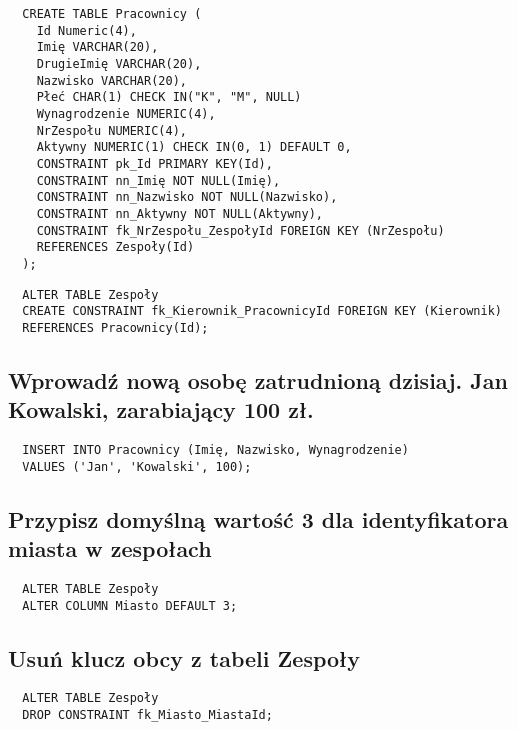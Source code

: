 \documentclass[a4paper]{article}
\begin{document}
\begin{verbatim}
  CREATE TABLE Pracownicy (
    Id Numeric(4),
    Imię VARCHAR(20),
    DrugieImię VARCHAR(20),
    Nazwisko VARCHAR(20),
    Płeć CHAR(1) CHECK IN("K", "M", NULL)
    Wynagrodzenie NUMERIC(4),
    NrZespołu NUMERIC(4),
    Aktywny NUMERIC(1) CHECK IN(0, 1) DEFAULT 0,
    CONSTRAINT pk_Id PRIMARY KEY(Id),
    CONSTRAINT nn_Imię NOT NULL(Imię),
    CONSTRAINT nn_Nazwisko NOT NULL(Nazwisko),
    CONSTRAINT nn_Aktywny NOT NULL(Aktywny),
    CONSTRAINT fk_NrZespołu_ZespołyId FOREIGN KEY (NrZespołu)
    REFERENCES Zespoły(Id)
  ); 
\end{verbatim}
\pagebreak
\begin{verbatim}
  ALTER TABLE Zespoły
  CREATE CONSTRAINT fk_Kierownik_PracownicyId FOREIGN KEY (Kierownik)
  REFERENCES Pracownicy(Id);
\end{verbatim}
\subsection{Wprowadź nową osobę zatrudnioną dzisiaj. Jan Kowalski, zarabiający 100 zł.}
\begin{verbatim}
  INSERT INTO Pracownicy (Imię, Nazwisko, Wynagrodzenie)
  VALUES ('Jan', 'Kowalski', 100);
\end{verbatim}
\subsection{Przypisz domyślną wartość 3 dla identyfikatora miasta w zespołach}
\begin{verbatim}
  ALTER TABLE Zespoły
  ALTER COLUMN Miasto DEFAULT 3;
\end{verbatim}
\subsection{Usuń klucz obcy z tabeli Zespoły}
\begin{verbatim}
  ALTER TABLE Zespoły
  DROP CONSTRAINT fk_Miasto_MiastaId;
\end{verbatim}
\end{document}
